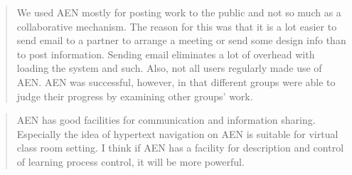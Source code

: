 \begin{quote}
We used AEN mostly for posting work to the public and not so much as a collaborative
mechanism. The reason for this was that it is a lot easier to send email to a partner to
arrange a meeting or send some design info than to post information. Sending email
eliminates a lot of overhead with loading the system and such. Also, not all users
regularly made use of AEN. AEN was successful, however, in that different groups were
able to judge their progress by examining other groups' work.
\end{quote}

\begin{quote}
AEN has good facilities for communication and information sharing.  Especially the idea
of hypertext navigation on AEN is suitable for virtual class room setting.
 I think if AEN has a facility for description and control of learning process control,
it will be more powerful.
\end{quote}






